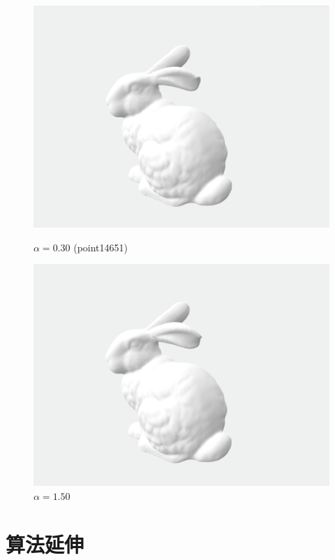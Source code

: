 \documentclass[lang=cn,11pt,a4paper]{elegantpaper}
\begin{document}
\begin{figure}[ht]
	\begin{minipage}{0.45\linewidth}
		\centering
		\includegraphics[width=0.97\linewidth]{image/result_point14651_alpha_0.3.png}
		\caption{$\alpha = 0.30$ (point14651)}
	\end{minipage}
	\begin{minipage}{0.45\linewidth}
		\centering
		\includegraphics[width=0.97\linewidth]{image/result_alpha_1.5.png}
		\caption{$\alpha = 1.50$}
	\end{minipage}
\end{figure}

\section{算法延伸}
\end{document}
